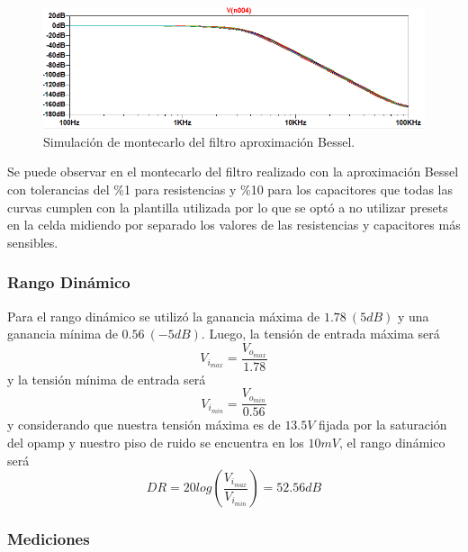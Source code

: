 \begin{figure}[H]
\centering
	\centering
	\includegraphics[width=\textwidth]{Imagenes-Ej1/bessel_mont.png}
	\caption{Simulación de montecarlo del filtro aproximación Bessel.}
	\label{bes_mont_sim}
\end{figure}

Se puede observar en el montecarlo del filtro realizado con la aproximación Bessel con tolerancias del \%1  para resistencias y \%10 para los capacitores que todas las curvas cumplen con la plantilla utilizada por lo que se optó a no utilizar presets en la celda midiendo por separado los valores de las resistencias y capacitores más sensibles.


\subsubsection{Rango Dinámico}

Para el rango dinámico se utilizó la ganancia máxima de $1.78 \ (5dB)$ y una ganancia mínima de $0.56 \ (-5dB)$. Luego, la tensión de entrada máxima será
\begin{equation}
V_{i_{max}}= \frac{V_{o_{max}}}{1.78}
\end{equation}
y la tensión mínima de entrada será
\begin{equation}
V_{i_{min}}= \frac{V_{o_{min}}}{0.56}
\end{equation}
y considerando que nuestra tensión máxima es de $13.5V$ fijada por la saturación del opamp y nuestro piso de ruido se encuentra en los $10mV$, el rango dinámico será
\begin{equation}
DR=20log(\frac{V_{i_{max}}}{V_{i_{min}}}) = 52.56dB
\end{equation}


\subsubsection{Mediciones}


